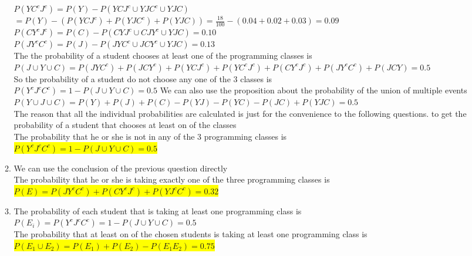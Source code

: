 \documentclass{article}
\begin{document}
\begin{enumerate}
\begin{enumerate}
		${P(YC^cJ^c)=P(Y)-P(YCJ^c\cup YJC^c \cup YJC)}$\\
		${=P(Y)-(P(YCJ^c)+P(YJC^c)+P(YJC))=\frac{18}{100}-(0.04+0.02+0.03)=0.09}$\\
		${P(CY^cJ^c)=P(C)-P(CYJ^c\cup CJY^c \cup YJC)=0.10}$\\
		${P(JY^cC^c)=P(J)-P(JYC^c\cup JCY^c \cup YJC)=0.13}$\\
		The the probability of a student chooses at least one of the programming classes is\\
		${P(J\cup Y\cup C)=P(JYC^c)+P(JCY^c)+P(YCJ^c)+P(YC^cJ^c)+P(CY^cJ^c)+P(JY^cC^c)+P(JCY)=0.5}$\\
		So the probability of a student do not choose any one of the 3 classes is\\
		${P(Y^cJ^cC^c)= 1- P(J\cup Y\cup C)=0.5}$
		We can also use the proposition about the probability of the union of multiple events\\
		${P(Y\cup J\cup C)=P(Y)+P(J)+P(C)-P(YJ)-P(YC)-P(JC)+P(YJC)=0.5}$\\
		The reason that all the individual probabilities are calculated is just for the convenience to the following questions.
		to get the probability of a student that chooses at least on of the classes\\
		\myansw
		The probability that he or she is not in any of the 3 programming classes is\\
		\colorbox{yellow}{
			${P(Y^cJ^cC^c)= 1- P(J\cup Y\cup C)=0.5}$
		}\\
		
		\item
		\mysolu
		We can use the conclusion of the previous question directly\\
		\myansw
		The probability that he or she is taking exactly one of the three programming classes is\\
		\colorbox{yellow}{
			${P(E)=P(JY^cC^c)+P(CY^cJ^c)+P(YJ^cC^c)=0.32}$
		}\\
		\item
		\mysolu
		The probability of each student that is taking at least one programming class is\\
		${P(E_i)=P(Y^cJ^cC^c)= 1- P(J\cup Y\cup C)=0.5}$\\
		\myansw
		The probability that at least on of the chosen students is taking at least one programming class is\\
		\colorbox{yellow}{
			${P(E_1\cup E_2)=P(E_1)+P(E_2)-P(E_1 E_2)=0.75}$
		}\\
		

\end{enumerate}
\end{enumerate}
\end{document}
